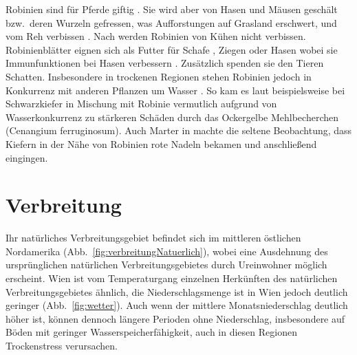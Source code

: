 \documentclass[twocolumn]{scrartcl}
\begin{document}
Robinien sind für Pferde giftig \citep{grosche2008robiniePferd}. Sie
wird aber von Hasen und Mäusen geschält bzw.\ deren Wurzeln gefressen,
was Aufforstungen auf Grasland erschwert, und vom Reh verbissen
\citep{barta2023robinieReh}. Nach \citet{berner2018robinie} werden
Robinien von Kühen nicht verbissen. Robinienblätter eignen sich als
Futter für Schafe \citep{ganai2009robnieSchaf}, Ziegen
\citep{papachristou1999robinieZiege} oder Hasen
\citep{singh2010robnieHasennahrung} wobei sie Immunfunktionen bei
Hasen verbessern \citep{yang2017robinieHasen}. Zusätzlich spenden sie
den Tieren Schatten. Insbesondere in trockenen Regionen stehen
Robinien jedoch in Konkurrenz mit anderen Pflanzen um Wasser
\citep{halasz2021robinieAlsTierutter}. So kam es laut
\citet[S.~96]{donaubauer1974kiefernsterben} beispielsweise bei
Schwarzkiefer in Mischung mit Robinie vermutlich aufgrund von
Wasserkonkurrenz zu stärkeren Schäden durch das Ockergelbe
Mehlbecherchen (Cenangium ferruginosum).  Auch Marter in
\citet[S.~93]{erteld1952robinieErtrag} machte die seltene Beobachtung,
dass Kiefern in der Nähe von Robinien rote Nadeln bekamen und
anschließend eingingen.

\section{Verbreitung}

Ihr natürliches Verbreitungsgebiet
befindet sich im mittleren östlichen Nordamerika
(Abb.~\ref{fig:verbreitungNatuerlich}), wobei eine Ausdehnung des
ursprünglichen natürlichen Verbreitungsgebietes durch Ureinwohner möglich
erscheint. Wien ist vom Temperaturgang einzelnen
Herkünften des natürlichen Verbreitungsgebietes ähnlich, die Niederschlagsmenge
ist in Wien jedoch deutlich geringer (Abb.~\ref{fig:wetter}). Auch wenn der
mittlere Monatsniederschlag deutlich höher ist, können dennoch längere Perioden
ohne Niederschlag, insbesondere auf Böden mit geringer Wasserspeicherfähigkeit,
auch in diesen Regionen Trockenstress verursachen.
\end{document}
